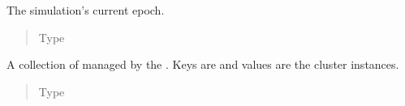 \documentclass[letterpaper,10pt,english]{sphinxmanual}
\begin{document}
\begin{fulllineitems}
\begin{fulllineitems}
\begin{quote}
\begin{description}
\end{description}\end{quote}

\end{fulllineitems}


\begin{fulllineitems}
\label{\detokenize{app.domain:app.domain.master_servers.Master.epoch}}
The simulation’s current epoch.
\begin{quote}\begin{description}
\item[{Type}] \leavevmode
{}

\end{description}\end{quote}

\end{fulllineitems}


\begin{fulllineitems}
\label{\detokenize{app.domain:app.domain.master_servers.Master.cluster_groups}}
A collection of {\hyperref[\detokenize{app.domain:app.domain.cluster_groups.Cluster}]{}} managed by the .
Keys are {\hyperref[\detokenize{app.domain:app.domain.cluster_groups.Cluster.id}]{}} and values are the
cluster instances.
\begin{quote}\begin{description}
\item[{Type}] \leavevmode
{\hyperref[\detokenize{app:app.type_hints.ClusterDict}]{}}

\end{description}\end{quote}

\end{fulllineitems}



\end{fulllineitems}
\end{document}
